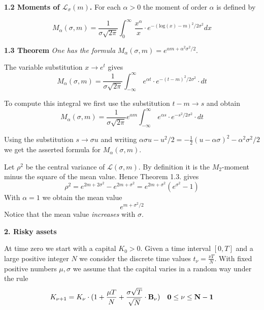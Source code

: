 \documentclass[12pt]{amsart}
\begin{document}
\medskip

 

\noindent
{\bf 1.2 Moments of $\mathcal L_\sigma(m)$.} For each $\alpha>0$
the moment of order $\alpha$ is defined by

\[
M_\alpha(\sigma,m)=\frac{1}{\sigma\sqrt{2\pi}}
\int_0^\infty\, \frac{x^\alpha}{x}\cdot e^{-(\text{log}(x)-m)^2/2\sigma^2}dx
\]
\medskip

\noindent
{\bf 1.3 Theorem} \emph{One has the formula}
$M_\alpha(\sigma,m)= 
e^{\alpha m +\alpha^2\sigma^2/2}.$
\medskip

 The variable substitution $x\to e^t$ gives
\[
M_\alpha(\sigma,m)=\frac{1}{\sigma\sqrt{2\pi}}
 \int_{-\infty}^\infty\,e^{\alpha t}\cdot
 e^{-(t-m)^2/2\sigma^2}\cdot dt
 \]


\noindent
To compute this integral we first use the substitution
$t-m\to s$ and obtain
\[
M_\alpha(\sigma,m)=\frac{1}{\sigma\sqrt{2\pi}}e^{\alpha m}
 \int_{-\infty}^\infty\,e^{\alpha s}\cdot
 e^{-s^2/2\sigma^2}\cdot dt
 \]


\noindent
Using the substitution $s\to \sigma u$ and writing
$\alpha\sigma u-u^2/2=-\frac{1}{2}(u-\alpha\sigma)^2-
\alpha^2\sigma^2/2$ we get the asserted formula for $M_\alpha(\sigma,m)$.
\bigskip

Let $\rho^2$ be the central variance of
$\mathcal L(\sigma,m)$. By definition it is 
the $M_2$-moment minus the square of the mean value.
Hence Theorem 1.3. gives
\[
\rho^2=e^{2m+2\sigma^2}-e^{2m+\sigma^2}=
e^{2m+\sigma^2}(e^{\sigma^2}-1)\tag{*}
\]
\bigskip
 \noindent
 With $\alpha=1$ we obtain the mean value 
 \[
 e^{m+\sigma^2/2}\tag{**}
 \]
Notice that the mean value \emph{increases} with $\sigma$.







\bigskip



\centerline{\bf\large  2. Risky assets} 
\bigskip

\noindent
At time zero we start with a capital
$K_0>0$. Given a time interval $[0,T]$ and a large positive integer $N$
we consider the discrete time values 
$t_\nu=\frac{\nu T}{N}$.
With fixed positive numbers $\mu,\sigma$ we assume that
the capital varies in a random way under the rule
 \[
K_{\nu+1}=K_\nu\cdot
(1+\frac{\mu T}{N}+
\frac{\sigma\sqrt{ T}}{\sqrt{N}}\cdot\bf B_\nu)\quad
0\leq\nu\leq N-1
\]
\end{document}
